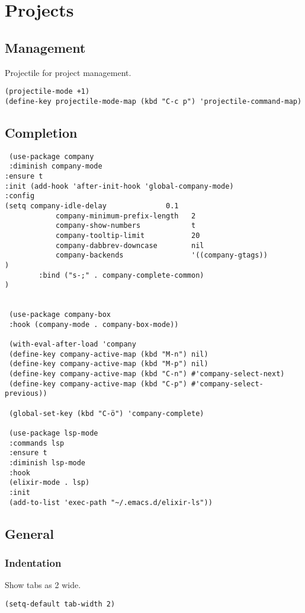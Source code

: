 \documentclass[11pt]{article}
\begin{document}
\section*{Projects}
\label{sec:orgd2fe2e9}
\subsection*{Management}
\label{sec:org9b58a2f}
Projectile for project management.
\begin{verbatim}
(projectile-mode +1)
(define-key projectile-mode-map (kbd "C-c p") 'projectile-command-map)
\end{verbatim}
\subsection*{Completion}
\label{sec:org719d32a}
\begin{verbatim}
 (use-package company
 :diminish company-mode
:ensure t
:init (add-hook 'after-init-hook 'global-company-mode)
:config
(setq company-idle-delay              0.1
			company-minimum-prefix-length   2
			company-show-numbers            t
			company-tooltip-limit           20
			company-dabbrev-downcase        nil
			company-backends                '((company-gtags))
)
		:bind ("s-;" . company-complete-common)
)


 (use-package company-box
 :hook (company-mode . company-box-mode))

 (with-eval-after-load 'company
 (define-key company-active-map (kbd "M-n") nil)
 (define-key company-active-map (kbd "M-p") nil)
 (define-key company-active-map (kbd "C-n") #'company-select-next)
 (define-key company-active-map (kbd "C-p") #'company-select-previous))

 (global-set-key (kbd "C-ö") 'company-complete)

 (use-package lsp-mode
 :commands lsp
 :ensure t
 :diminish lsp-mode
 :hook
 (elixir-mode . lsp)
 :init
 (add-to-list 'exec-path "~/.emacs.d/elixir-ls"))
\end{verbatim}
\subsection*{General}
\label{sec:org0ec71f3}
\subsubsection*{Indentation}
\label{sec:orgc6f0712}
Show tabs as 2 wide.
\begin{verbatim}
(setq-default tab-width 2)
\end{verbatim}
\end{document}
